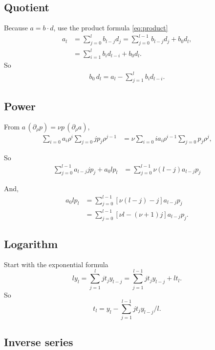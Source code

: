 \documentclass[preprint]{revtex4-1}
\numberwithin{equation}{subsection}
\numberwithin{table}{section}
\begin{document}
\subsection{Quotient}


Because $a = b \cdot d$,
use the product formula \eqref{eq:product}
\begin{align*}
  a_l
  &= \sum_{j = 0}^{l} b_{l-j} d_j
  = \sum_{j = 0}^{l - 1} b_{l - j} d_j + b_0 d_l,
\\
  &= \sum_{i = 1}^{l} b_{i} d_{l - i} + b_0 d_l.
\end{align*}
So
\begin{align*}
  b_0 \, d_l = a_l -\sum_{j = 1}^{l} b_{i} d_{l - i}.
\end{align*}


\subsection{Power}

From $a \, (\partial_\rho p) = \nu p \, (\partial_\rho a)$,
%
\begin{align*}
  \sum_{i = 0} a_i \rho^i
  \sum_{j = 0} j p_j \rho^{j - 1}
&=
  \nu
  \sum_{i = 0} i a_i \rho^{i - 1}
  \sum_{j = 0} p_j \rho^{j},
\end{align*}

So
\begin{align*}
  \sum_{j = 0}^{l-1} a_{l-j} j p_j + a_0 l p_l
&=
  \sum_{j = 0}^{l-1} \nu (l - j) a_{l - j} p_j
\end{align*}

And,
\begin{align*}
  a_0 l p_l
&=
  \sum_{j = 0}^{l-1} [ \nu (l - j) - j] a_{l - j} p_j
\\
&=
  \sum_{j = 0}^{l-1} [ \nu l - (\nu + 1) j] a_{l - j} p_j.
\end{align*}


\subsection{Logarithm}

Start with the exponential formula
\[
  l y_l = \sum_{j = 1}^l j t_j y_{l - j}
  = \sum_{j = 1}^{l - 1} j t_j y_{l - j} + l t_l.
\]
So
\[
  t_l = y_l - \sum_{j = 1}^{l-1} j t_j y_{l - j}/l.
\]


\subsection{Inverse series}
\end{document}
